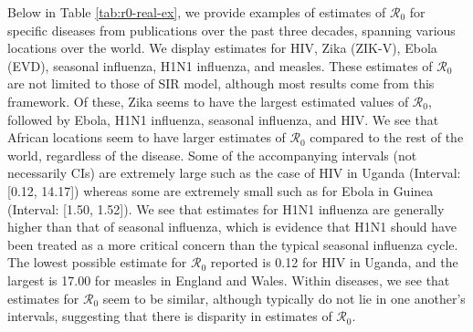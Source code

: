 \documentclass[12pt]{article}
\newcommand{\rr}{\ensuremath{\mathcal{R}_0}}
\begin{document}
Below in Table \ref{tab:r0-real-ex}, we provide examples of estimates of $\rr$ for specific diseases from publications over the past three decades, spanning various locations over the world.  We display estimates for HIV, Zika (ZIK-V), Ebola (EVD), seasonal influenza, H1N1 influenza, and measles.  These estimates of $\rr$ are not limited to those of SIR model, although most results come from this framework.  Of these, Zika seems to have the largest estimated values of $\rr$, followed by Ebola, H1N1 influenza, seasonal influenza, and HIV.  We see that African locations seem to have larger estimates of $\rr$ compared to the rest of the world, regardless of the disease.  Some of the accompanying intervals (not necessarily CIs) are extremely large such as the case of HIV in Uganda (Interval: [0.12, 14.17]) whereas some are extremely small such as for Ebola in Guinea (Interval: [1.50, 1.52]).  We see that estimates for H1N1 influenza are generally higher than that of seasonal influenza, which is evidence that H1N1 should have been treated as a more critical concern than the typical seasonal influenza cycle.  The lowest possible estimate for $\rr$ reported is 0.12 for HIV in Uganda, and the largest is 17.00 for measles in England and Wales.  Within diseases, we see that estimates for $\rr$ seem to be similar, although typically do not lie in one another's intervals, suggesting that there is disparity in estimates of $\rr$.
\end{document}
